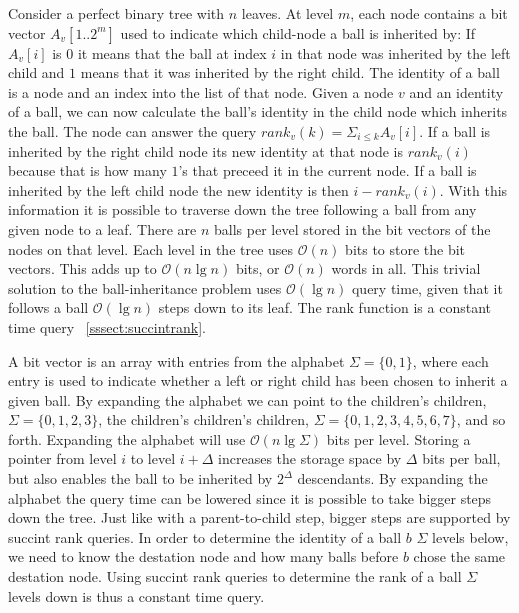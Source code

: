 Consider a perfect binary tree with $n$ leaves. At level $m$, each node contains a bit vector $A_v[1..2^m]$ used to indicate which child-node a ball is inherited by: If $A_v[i]$ is $0$ it means that the ball at index $i$ in that node was inherited by the left child and $1$ means that it was inherited by the right child. The identity of a ball is a node and an index into the list of that node. Given a node $v$ and an identity of a ball, we can now calculate the ball's identity in the child node which inherits the ball. The node can answer the query $rank_v(k) = \Sigma_{i \leq k} A_v[i]$. If a ball is inherited by the right child node its new identity at that node is $rank_v(i)$ because that is how many $1$'s that preceed it in the current node. If a ball is inherited by the left child node the new identity is then $i-rank_v(i)$. With this information it is possible to traverse down the tree following a ball from any given node to a leaf. There are $n$ balls per level stored in the bit vectors of the nodes on that level. Each level in the tree uses $\mathcal{O}(n)$ bits to store the bit vectors. This adds up to $\mathcal{O}(n \lg n)$ bits, or $\mathcal{O}(n)$ words in all. This trivial solution to the ball-inheritance problem uses $\mathcal{O}(\lg n)$ query time, given that it follows a ball $\mathcal{O}(\lg n)$ steps down to its leaf. The rank function is a constant time query ~\ref{sssect:succintrank}. 


A bit vector is an array with entries from the alphabet $\Sigma = \{0,1\}$, where each entry is used to indicate whether a left or right child has been chosen to inherit a given ball. By expanding the alphabet we can point to the children's children, $\Sigma = \{0,1,2,3\}$, the children's children's children, $\Sigma = \{0,1,2,3,4,5,6,7\}$, and so forth. Expanding the alphabet will use $\mathcal{O}(n \lg \Sigma)$ bits per level. Storing a pointer from level $i$ to level $i+\Delta$ increases the storage space by $\Delta$ bits per ball, but also enables the ball to be inherited by $2^\Delta$ descendants. By expanding the alphabet the query time can be lowered since it is possible to take bigger steps down the tree. Just like with a parent-to-child step, bigger steps are supported by succint rank queries. In order to determine the identity of a ball $b$ $\Sigma$ levels below, we need to know the destation node and how many balls before $b$ chose the same destation node. Using succint rank queries to determine the rank of a ball $\Sigma$ levels down is thus a constant time query.

